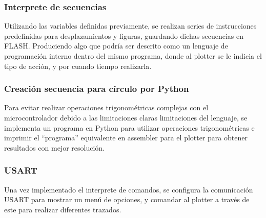 \subsubsection{Interprete de secuencias}
Utilizando las variables definidas previamente, se realizan series de instrucciones predefinidas para desplazamientos y figuras, guardando dichas secuencias en FLASH. Produciendo algo que podría ser descrito como un lenguaje de programación interno dentro del mismo programa, donde al plotter se le indicia el tipo de acción, y por cuando tiempo realizarla. 

\subsubsection{Creación secuencia para círculo por Python}
Para evitar realizar operaciones trigonométricas complejas con el microcontrolador debido a las limitaciones claras limitaciones del lenguaje, se implementa un programa en Python para utilizar operaciones trigonométricas e imprimir el ``programa'' equivalente en assembler para el plotter para obtener resultados con mejor resolución.

\subsubsection{USART}
Una vez implementado el interprete de comandos, se configura la comunicación USART para mostrar un menú de opciones, y comandar al plotter a través de este para realizar diferentes trazados.


